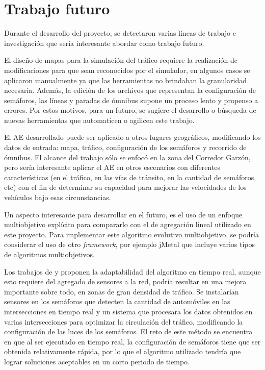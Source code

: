 \section{Trabajo futuro}
Durante el desarrollo del proyecto, se detectaron varias líneas de trabajo e investigación que sería interesante abordar como trabajo futuro.

El diseño de mapas para la simulación del tráfico requiere la realización de modificaciones para que sean reconocidos por el simulador, en algunos casos se aplicaron manualmente ya que las herramientas no brindaban la granularidad necesaria. Además, la edición de los archivos que representan la configuración de semáforos, las líneas y paradas de ómnibus supone un proceso lento y propenso a errores. Por estos motivos, para un futuro, se sugiere el desarrollo o búsqueda de nuevas herramientas que automaticen o agilicen este trabajo.

El AE desarrollado puede ser aplicado a otros lugares geográficos, modificando  los datos de entrada: mapa, tráfico, configuración de los semáforos y recorrido de ómnibus. El alcance del trabajo sólo se enfocó en la zona del Corredor Garzón, pero sería interesante aplicar el AE en otros escenarios con diferentes características (en el tráfico, en las vías de tránsito, en la cantidad de semáforos, etc) con el fin de determinar su capacidad para mejorar las velocidades de los vehículos bajo esas circunstancias.

Un aspecto interesante para desarrollar en el futuro, es el uso de un enfoque multiobjetivo explícito para compararlo con el de agregación lineal utilizado en este proyecto. Para implementar este algoritmo evolutivo multiobjetivo, se podría considerar el uso de otro \emph{framework}, por ejemplo jMetal que incluye varios tipos de algoritmos multiobjetivos.

Los trabajos de  \citet{Montana1996} y \citet{Vogel2000} proponen la adaptabilidad del algoritmo en tiempo real, aunque esto requiere del agregado de sensores a la red, podría resultar en una mejora importante sobre todo, en zonas de gran densidad de tráfico. Se instalarían sensores en los semáforos que detecten la cantidad de automóviles en las intersecciones en tiempo real y un sistema que procesara los datos obtenidos en varias intersecciones para optimizar la circulación del tráfico, modificando la configuración de las luces de los semáforos. El reto de este método se encuentra en que al ser ejecutado en tiempo real, la configuración de semáforos tiene que ser obtenida relativamente rápida, por lo que el algoritmo utilizado tendría que lograr soluciones aceptables en un corto periodo de tiempo.
